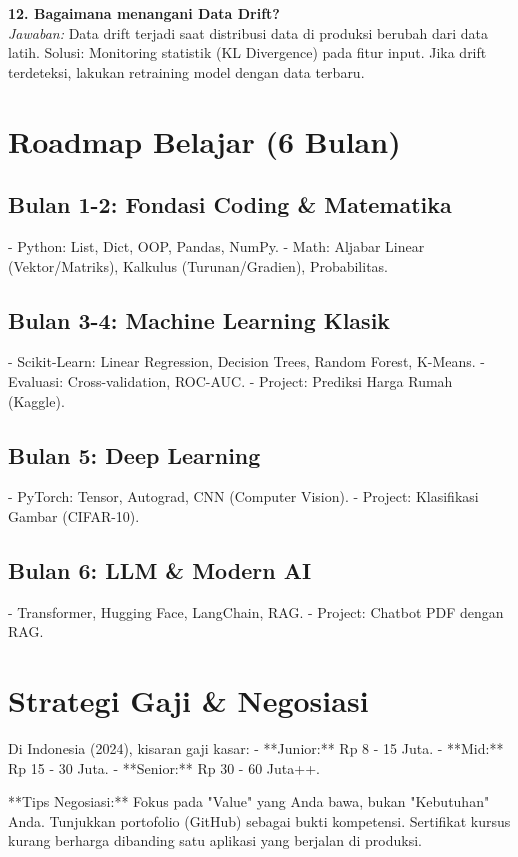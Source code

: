 \textbf{12. Bagaimana menangani Data Drift?} \\
\textit{Jawaban:} Data drift terjadi saat distribusi data di produksi berubah dari data latih. Solusi: Monitoring statistik (KL Divergence) pada fitur input. Jika drift terdeteksi, lakukan retraining model dengan data terbaru.

\section{Roadmap Belajar (6 Bulan)}

\subsection*{Bulan 1-2: Fondasi Coding \& Matematika}
- Python: List, Dict, OOP, Pandas, NumPy.
- Math: Aljabar Linear (Vektor/Matriks), Kalkulus (Turunan/Gradien), Probabilitas.

\subsection*{Bulan 3-4: Machine Learning Klasik}
- Scikit-Learn: Linear Regression, Decision Trees, Random Forest, K-Means.
- Evaluasi: Cross-validation, ROC-AUC.
- Project: Prediksi Harga Rumah (Kaggle).

\subsection*{Bulan 5: Deep Learning}
- PyTorch: Tensor, Autograd, CNN (Computer Vision).
- Project: Klasifikasi Gambar (CIFAR-10).

\subsection*{Bulan 6: LLM \& Modern AI}
- Transformer, Hugging Face, LangChain, RAG.
- Project: Chatbot PDF dengan RAG.

\section{Strategi Gaji \& Negosiasi}

Di Indonesia (2024), kisaran gaji kasar:
- **Junior:** Rp 8 - 15 Juta.
- **Mid:** Rp 15 - 30 Juta.
- **Senior:** Rp 30 - 60 Juta++.

**Tips Negosiasi:** Fokus pada "Value" yang Anda bawa, bukan "Kebutuhan" Anda. Tunjukkan portofolio (GitHub) sebagai bukti kompetensi. Sertifikat kursus kurang berharga dibanding satu aplikasi yang berjalan di produksi.
